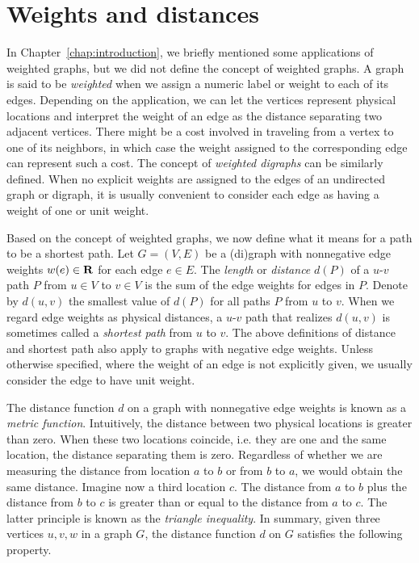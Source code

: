 
\section{Weights and distances}
\label{sec:graph_algorithms:weights_distances}

In Chapter~\ref{chap:introduction}, we briefly mentioned some
applications of weighted graphs, but we did not define the concept of
weighted graphs. A graph is said to be
\emph{weighted} when we assign a numeric label
or weight to each of its edges. Depending on the application, we can
let the vertices represent physical locations and interpret the weight
of an edge as the distance separating two adjacent
vertices. There might be a cost involved in traveling from a vertex
to one of its neighbors, in which case the weight assigned to the
corresponding edge can represent such a cost. The concept
of \emph{weighted digraphs} can be similarly
defined. When no explicit weights are assigned to the edges of an
undirected graph or digraph, it is usually convenient to consider each
edge as having a weight of one or unit weight.

Based on the concept of weighted graphs, we now
define what it means for a path to be a shortest
path. Let $G = (V,E)$ be a (di)graph with
nonnegative edge weights $w(e) \in \mathbf{R}$ for
each edge $e \in E$. The \emph{length} or
\emph{distance} $d(P)$ of a $u$-$v$ path $P$ from
$u \in V$ to $v \in V$ is the sum of the edge weights for edges in
$P$. Denote by $d(u,v)$ the smallest value of $d(P)$ for all paths $P$
from $u$ to $v$. When we regard edge weights as physical
distances, a $u$-$v$ path that realizes $d(u,v)$ is
sometimes called a \emph{shortest path} from $u$
to $v$. The above definitions of distance and shortest path also apply
to graphs with negative edge weights. Unless otherwise specified,
where the weight of an edge is not explicitly given, we usually
consider the edge to have unit weight.

The distance function $d$ on a graph with
nonnegative edge weights is known as a
\emph{metric function}. Intuitively, the
distance between two physical locations is greater
than zero. When these two locations coincide, i.e. they are one and
the same location, the distance separating them is zero. Regardless of
whether we are measuring the distance from location $a$ to $b$ or from
$b$ to $a$, we would obtain the same distance. Imagine now a third
location $c$. The distance from $a$ to $b$ plus the distance from $b$
to $c$ is greater than or equal to the distance from $a$ to $c$. The
latter principle is known as the
\emph{triangle inequality}. In summary,
given three vertices $u,v,w$ in a graph $G$, the distance
function $d$ on $G$ satisfies the following
property.

